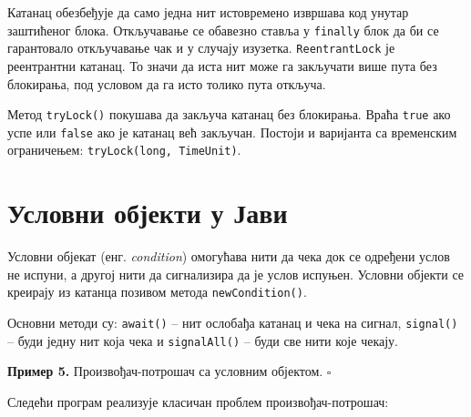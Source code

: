 Катанац обезбеђује да само једна нит истовремено извршава код унутар заштићеног блока. Откључавање се обавезно ставља у \texttt{finally} блок да би се гарантовало откључавање чак и у случају изузетка. \texttt{ReentrantLock} је реентрантни катанац. То значи да иста нит може га закључати више пута без блокирања, под условом да га исто толико пута откључа.

Метод \texttt{tryLock()} покушава да закључа катанац без блокирања. Враћа \texttt{true} ако успе или \texttt{false} ако је катанац већ закључан. Постоји и варијанта са временским ограничењем: \texttt{tryLock(long, TimeUnit)}.


\section{Условни објекти у Јави}

Условни објекат (енг. \textit{condition}) омогућава нити да чека док се одређени услов не испуни, а другој нити да сигнализира да је услов испуњен. Условни објекти се креирају из катанца позивом метода \texttt{newCondition()}.

Основни методи су: \texttt{await()} – нит ослобађа катанац и чека на сигнал, \texttt{signal()} – буди једну нит која чека и \texttt{signalAll()} – буди све нити које чекају.


\bigskip

\noindent \textbf{Пример 5.} Произвођач-потрошач са условним објектом. $\square$

\medskip

Следећи програм реализује класичан проблем произвођач-потрошач:


